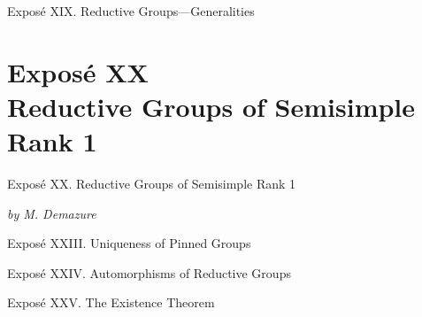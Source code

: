 \documentclass[11pt,a4paper,oneside]{book}
\providecommand{\SGAProof}[1]{%
  \par\smallskip\noindent\textit{#1.}\quad
}
\begin{document}
\clearpage
\graphicspath{{xviii/}{xiv/}{figures/}{figures/exp7/}{assets/diagrams/}}


\clearpage


\clearpage
{}
  {Expos\'e XIX. Reductive Groups---Generalities}


\clearpage
\chapter*{Expos\'e XX\\Reductive Groups of Semisimple Rank 1}
  {Expos\'e XX. Reductive Groups of Semisimple Rank 1}
\begin{center}
  \textit{by M. Demazure}
\end{center}
\setcounter{section}{0}
\renewcommand{\thesection}{\arabic{section}}


\clearpage
{}
\setcounter{section}{0}
\setcounter{subsection}{0}
\renewcommand{\thesection}{\arabic{section}}
\renewcommand{\thesubsection}{\thesection.\arabic{subsection}}


\clearpage
\graphicspath{{xxii/}{xxii/figures/}{xviii/}{xiv/}{figures/}{figures/exp7/}{assets/diagrams/}}


\clearpage
{}
  {Expos\'e XXIII. Uniqueness of Pinned Groups}
\renewcommand{\SGAProof}{%
  \par\smallskip\noindent\textit{Proof.}\quad
}


\clearpage
{}
  {Expos\'e XXIV. Automorphisms of Reductive Groups}


\clearpage
{}
  {Expos\'e XXV. The Existence Theorem}

\end{document}
